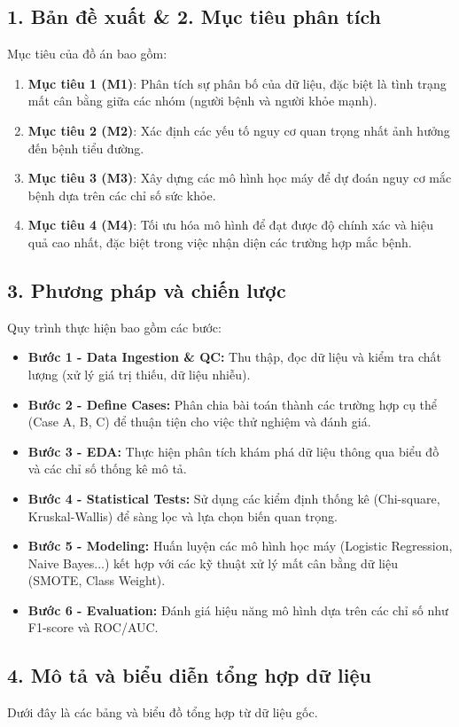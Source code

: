 \documentclass{article}
\begin{document}
\subsection{1. Bản đề xuất \& 2. Mục tiêu phân tích}
Mục tiêu của đồ án bao gồm:
\begin{enumerate}
    \item \textbf{Mục tiêu 1 (M1)}: Phân tích sự phân bố của dữ liệu, đặc biệt là tình trạng mất cân bằng giữa các nhóm (người bệnh và người khỏe mạnh).
    \item \textbf{Mục tiêu 2 (M2)}: Xác định các yếu tố nguy cơ quan trọng nhất ảnh hưởng đến bệnh tiểu đường.
    \item \textbf{Mục tiêu 3 (M3)}: Xây dựng các mô hình học máy để dự đoán nguy cơ mắc bệnh dựa trên các chỉ số sức khỏe.
    \item \textbf{Mục tiêu 4 (M4)}: Tối ưu hóa mô hình để đạt được độ chính xác và hiệu quả cao nhất, đặc biệt trong việc nhận diện các trường hợp mắc bệnh.
\end{enumerate}

\subsection{3. Phương pháp và chiến lược}
Quy trình thực hiện bao gồm các bước:
\begin{itemize}
    \item \textbf{Bước 1 - Data Ingestion \& QC:} Thu thập, đọc dữ liệu và kiểm tra chất lượng (xử lý giá trị thiếu, dữ liệu nhiễu).
    \item \textbf{Bước 2 - Define Cases:} Phân chia bài toán thành các trường hợp cụ thể (Case A, B, C) để thuận tiện cho việc thử nghiệm và đánh giá.
    \item \textbf{Bước 3 - EDA:} Thực hiện phân tích khám phá dữ liệu thông qua biểu đồ và các chỉ số thống kê mô tả.
    \item \textbf{Bước 4 - Statistical Tests:} Sử dụng các kiểm định thống kê (Chi-square, Kruskal-Wallis) để sàng lọc và lựa chọn biến quan trọng.
    \item \textbf{Bước 5 - Modeling:} Huấn luyện các mô hình học máy (Logistic Regression, Naive Bayes...) kết hợp với các kỹ thuật xử lý mất cân bằng dữ liệu (SMOTE, Class Weight).
    \item \textbf{Bước 6 - Evaluation:} Đánh giá hiệu năng mô hình dựa trên các chỉ số như F1-score và ROC/AUC.
\end{itemize}

\subsection{4. Mô tả và biểu diễn tổng hợp dữ liệu}
Dưới đây là các bảng và biểu đồ tổng hợp từ dữ liệu gốc.
\end{document}
